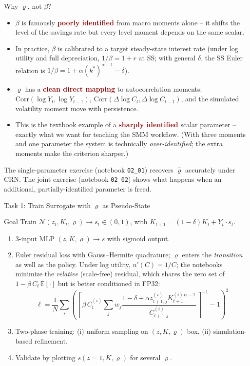 \documentclass[10pt,aspectratio=169]{beamer}
\newcommand{\E}[1]{\mathbb{E}\!\left[#1\right]}
\newcommand{\emphc}[1]{\textbf{\textcolor{darkred}{#1}}}
\begin{document}
\begin{frame}{Why $\varrho$, not $\beta$?}
\small
\begin{itemize}
  \item $\beta$ is famously \emphc{poorly identified} from macro moments alone -- it shifts the level of the savings rate but every level moment depends on the same scalar.
  \item In practice, $\beta$ is calibrated to a target steady-state interest rate (under log utility and full depreciation, $1/\beta = 1+r$ at SS; with general $\delta$, the SS Euler relation is $1/\beta = 1 + \alpha (k^*)^{\alpha-1} - \delta$).
  \item $\varrho$ has a \emphc{clean direct mapping} to autocorrelation moments: $\mathrm{Corr}(\log Y_t, \log Y_{t-1})$, $\mathrm{Corr}(\Delta\log C_t, \Delta\log C_{t-1})$, and the simulated volatility moment move with persistence.
  \item This is the textbook example of a \emphc{sharply identified} scalar parameter -- exactly what we want for teaching the SMM workflow. (With three moments and one parameter the system is technically \emph{over-identified}; the extra moments make the criterion sharper.)
\end{itemize}
\vspace{0.2cm}
The single-parameter exercise (notebook \texttt{02\_01}) recovers $\hat\varrho$ accurately under CRN. The joint exercise (notebook \texttt{02\_02}) shows what happens when an additional, partially-identified parameter is freed.
\end{frame}

\begin{frame}{Task 1: Train Surrogate with $\varrho$ as Pseudo-State}
\begin{block}{Goal}
Train $\mathcal{N}(z_t, K_t, \varrho) \to s_t \in (0,1)$, with $K_{t+1} = (1-\delta)K_t + Y_t \cdot s_t$.
\end{block}
\begin{enumerate}
  \itemsep1pt
  \item 3-input MLP $(z, K, \varrho) \to s$ with sigmoid output.
  \item Euler residual loss with Gauss--Hermite quadrature; $\varrho$ enters the \emph{transition} as well as the policy. Under log utility, $u'(C) = 1/C$; the notebooks minimize the \emph{relative} (scale-free) residual, which shares the zero set of $1 - \beta\,C_t\,\E{\cdot}$ but is better conditioned in FP32:
  {\small\[
  \ell = \frac{1}{N}\sum_i \!\left(\left[\,\beta\, C^{(i)}_t \sum_j w_j \frac{1-\delta + \alpha z^{(i)}_{t+1,j} K^{(i)\,\alpha-1}_{t+1}}{C^{(i)}_{t+1,j}}\,\right]^{-1} - 1\right)^{\!2}
  \]}
  \vspace{-10pt}
  \item Two-phase training: (i) uniform sampling on $(z, K, \varrho)$ box, (ii) simulation-based refinement.
  \item Validate by plotting $s(z=1, K, \varrho)$ for several $\varrho$.
\end{enumerate}
\end{frame}
\end{document}
